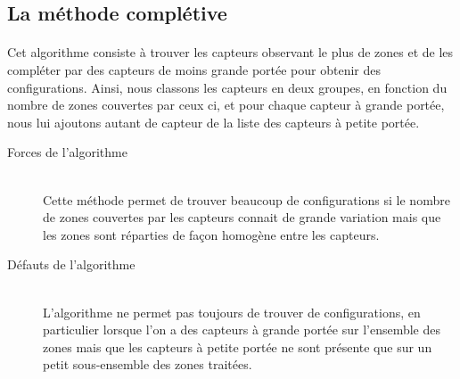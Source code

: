 \subsection{La méthode complétive}
    \paragraph{}
        Cet algorithme consiste à trouver les capteurs observant le plus de
        zones et de les compléter par des capteurs de moins grande portée pour
        obtenir des configurations.
        Ainsi, nous classons les capteurs en deux groupes, en fonction du nombre
        de zones couvertes par ceux ci, et pour chaque capteur à grande portée,
        nous lui ajoutons autant de capteur de la liste des capteurs à petite
        portée.

    \begin{description}
        \item[Forces de l'algorithme]\hfill \\
            Cette méthode permet de trouver beaucoup de configurations si le
            nombre de zones couvertes par les capteurs connait de grande
            variation mais que les zones sont réparties de façon homogène entre
            les capteurs.
        \item[Défauts de l'algorithme]\hfill \\
            L'algorithme ne permet pas toujours de trouver de configurations,
            en particulier lorsque l'on a des capteurs à grande portée sur
            l'ensemble des zones mais que les capteurs à petite portée ne sont
            présente que sur un petit sous-ensemble des zones traitées.
    \end{description}
